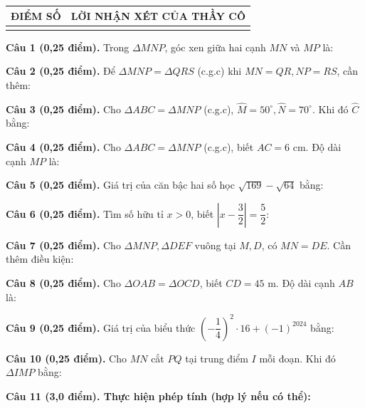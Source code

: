 \documentclass[12pt,a4paper]{article}
\begin{document}
\vspace{1.0mm}

\noindent
\begin{tabularx}{\linewidth}{|p{3.2cm}|X|}
\hline
\centering\textbf{ĐIỂM SỐ} & \centering\textbf{LỜI NHẬN XÉT CỦA THẦY CÔ} \tabularnewline
\hline
\rule{0pt}{1.8cm} & \tabularnewline
\hline
\end{tabularx}

\vspace{1.2mm}
\noindent\textbf{Câu 1 (0,25 điểm).} Trong $\Delta MNP$, góc xen giữa hai cạnh $MN$ và $MP$ là: \par\vspace{2.2mm}
\noindent\textbf{Câu 2 (0,25 điểm).} Để $\Delta MNP = \Delta QRS$ (c.g.c) khi $MN=QR, NP=RS$, cần thêm: \par\vspace{2.2mm}
\noindent\textbf{Câu 3 (0,25 điểm).} Cho $\Delta ABC = \Delta MNP$ (c.g.c), $\widehat{M}=50^\circ, \widehat{N}=70^\circ$. Khi đó $\widehat{C}$ bằng: \par\vspace{2.2mm}
\noindent\textbf{Câu 4 (0,25 điểm).} Cho $\Delta ABC = \Delta MNP$ (c.g.c), biết $AC = 6\text{ cm}$. Độ dài cạnh $MP$ là: \par\vspace{2.2mm}
\noindent\textbf{Câu 5 (0,25 điểm).} Giá trị của căn bậc hai số học $\sqrt{169} - \sqrt{64}$ bằng: \par\vspace{2.2mm}
\noindent\textbf{Câu 6 (0,25 điểm).} Tìm số hữu tỉ $x > 0$, biết $\left|x - \dfrac{3}{2}\right| = \dfrac{5}{2}$: \par\vspace{2.2mm}
\noindent\textbf{Câu 7 (0,25 điểm).} Cho $\Delta MNP, \Delta DEF$ vuông tại $M, D$, có $MN=DE$. Cần thêm điều kiện: \par\vspace{2.2mm}
\noindent\textbf{Câu 8 (0,25 điểm).} Cho $\Delta OAB = \Delta OCD$, biết $CD = 45\text{ m}$. Độ dài cạnh $AB$ là: \par\vspace{2.2mm}
\noindent\textbf{Câu 9 (0,25 điểm).} Giá trị của biểu thức $\left(-\dfrac{1}{4}\right)^2 \cdot 16 + (-1)^{2024}$ bằng: \par\vspace{2.2mm}
\noindent\textbf{Câu 10 (0,25 điểm).} Cho $MN$ cắt $PQ$ tại trung điểm $I$ mỗi đoạn. Khi đó $\Delta IMP$ bằng: \par\vspace{2.2mm}
\vspace{0.2mm}
\noindent\textbf{Câu 11 (3,0 điểm). Thực hiện phép tính (hợp lý nếu có thể):}
\vspace{0.6mm}
\end{document}
